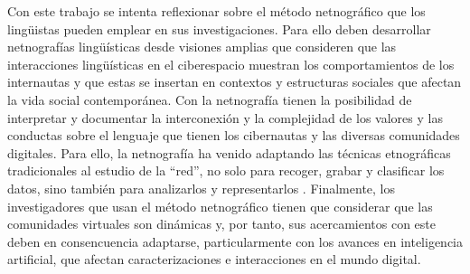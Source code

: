 Con este trabajo se intenta reflexionar sobre el método netnográfico que
los lingüistas pueden emplear en sus investigaciones. Para ello deben
desarrollar netnografías lingüísticas desde visiones amplias que
consideren que las interacciones lingüísticas en el ciberespacio
muestran los comportamientos de los internautas y que estas se insertan
en contextos y estructuras sociales que afectan la vida social
contemporánea. Con la netnografía tienen la posibilidad de interpretar y
documentar la interconexión y la complejidad de los valores y las
conductas sobre el lenguaje que tienen los cibernautas y las diversas
comunidades digitales. Para ello, la netnografía ha venido adaptando las
técnicas etnográficas tradicionales al estudio de la ``red'', no solo
para recoger, grabar y clasificar los datos, sino también para
analizarlos y representarlos \cite{addeo2020netnography}. Finalmente, los investigadores que usan el método
netnográfico tienen que considerar que las comunidades virtuales son
dinámicas y, por tanto, sus acercamientos con este deben en
consencuencia adaptarse, particularmente con los avances en inteligencia
artificial, que afectan caracterizaciones e interacciones en el mundo
digital.
